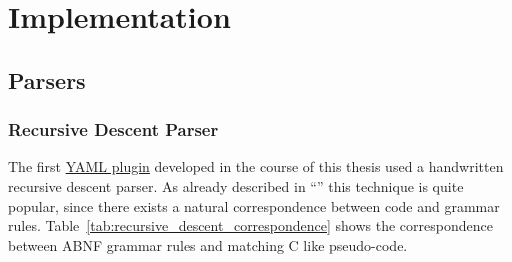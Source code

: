 \chapter{Implementation}

\section{Parsers}

\subsection{Recursive Descent Parser}

The first \href{https://github.com/ElektraInitiative/libelektra/commit/3d2d4644cb08e83f0b3305b8aeae546ada52dfe7}{YAML plugin} developed in the course of this thesis used a handwritten recursive descent parser. As already described in “” this technique is quite popular, since there exists a natural correspondence between code and grammar rules. Table~\ref{tab:recursive_descent_correspondence} shows the correspondence between \gls{ABNF} grammar rules and matching C like pseudo-code.

